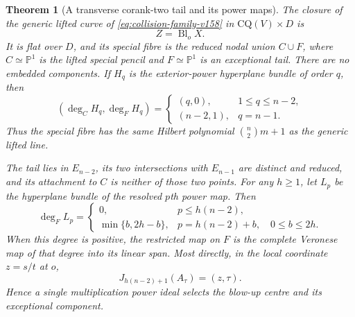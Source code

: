 \documentclass[11pt,reqno]{amsart}
\numberwithin{equation}{section}
\newtheorem{theorem}{Theorem}[section]
\theoremstyle{definition}\newtheorem{definition}[theorem]{Definition}
\theoremstyle{remark}\newtheorem{remark}[theorem]{Remark}
\newcommand{\Pj}{\mathbb P}\newcommand{\A}{\mathbb A}
\begin{document}
\begin{theorem}[A transverse corank-two tail and its power maps]
\label{thm:hilbert-tail-v158}
The closure of the generic lifted curve of
\eqref{eq:collision-family-v158} in $\mathrm{CQ}(V)\times D$ is
\begin{equation}\label{eq:tail-blowup-v158}
                         Z=\operatorname{Bl}_o X.
\end{equation}
It is flat over $D$, and its special fibre is the reduced nodal union
$C\cup F$, where $C\simeq\Pj^1$ is the lifted special pencil and
$F\simeq\Pj^1$ is an exceptional tail. There are no embedded components.
If $H_q$ is the exterior-power hyperplane bundle of order $q$, then
\begin{equation}\label{eq:tail-degrees-v158}
 (\deg_C H_q,\deg_F H_q)=
 \begin{cases}(q,0),&1\leq q\leq n-2,\\
              (n-2,1),&q=n-1.
 \end{cases}
\end{equation}
Thus the special fibre has the same Hilbert polynomial
$\binom n2m+1$ as the generic lifted line.

The tail lies in $E_{n-2}$, its two intersections with $E_{n-1}$
are distinct and reduced, and its attachment to $C$ is neither of
those two points. For any $h\geq1$, let $L_p$ be the hyperplane
bundle of the resolved $p$th power map. Then
\begin{equation}\label{eq:tail-power-degree-v158}
 \deg_F L_p=
 \begin{cases}
 0,&p\leq h(n-2),\\
 \min\{b,2h-b\},&p=h(n-2)+b,\quad 0\leq b\leq2h.
 \end{cases}
\end{equation}
When this degree is positive, the restricted map on $F$ is the
complete Veronese map of that degree into its linear span.
Most directly, in the local coordinate $z=s/t$ at $o$,
\begin{equation}\label{eq:one-power-centre-v158}
 J_{h(n-2)+1}(A_\tau)=(z,\tau).
\end{equation}
Hence a single multiplication power ideal selects the blow-up centre
and its exceptional component.
\end{theorem}
\end{document}
